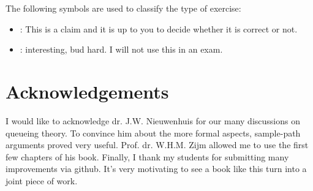 The following symbols are used to classify the type of exercise:
\begin{itemize}
\item \faBalanceScale: This is a claim and it is up to you to decide whether it is correct or not.
\item \faRocket: interesting, bud hard. I will not use this in an exam.
\end{itemize}

\section*{Acknowledgements}

I would like to acknowledge dr.
J.W.
Nieuwenhuis for our many discussions on queueing theory.
To convince him about the more formal aspects, sample-path arguments proved very useful.
Prof.
dr.
W.H.M.
Zijm allowed me to use the first few chapters of his book.
Finally, I thank my students for submitting many improvements via github.
It's very motivating to see a book like this turn into a joint piece of work.



